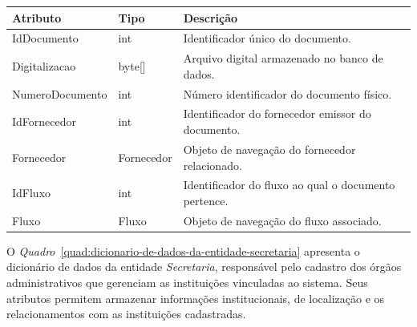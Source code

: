 \begin{quadro}[H]
\caption[Dicionário de dados da entidade Documento]{Dicionário de dados da entidade Documento}
\label{quad:dicionario-de-dados-da-entidade-documento}

\begin{tabular}{|p{}|p{}|p{}|}
\hline
\textbf{Atributo} & \textbf{Tipo} & \textbf{Descrição} \\ 
\hline
IdDocumento & int & Identificador único do documento. \\ 
\hline
Digitalizacao & byte[] & Arquivo digital armazenado no banco de dados. \\ 
\hline
NumeroDocumento & int & Número identificador do documento físico. \\ 
\hline
IdFornecedor & int & Identificador do fornecedor emissor do documento. \\ 
\hline
Fornecedor & Fornecedor & Objeto de navegação do fornecedor relacionado. \\ 
\hline
IdFluxo & int & Identificador do fluxo ao qual o documento pertence. \\ 
\hline
Fluxo & Fluxo & Objeto de navegação do fluxo associado. \\ 
\hline
\end{tabular}


\end{quadro}



O \textit{Quadro}~\ref{quad:dicionario-de-dados-da-entidade-secretaria} apresenta o dicionário de dados da entidade \textit{Secretaria}, responsável pelo cadastro dos órgãos administrativos que gerenciam as instituições vinculadas ao sistema. Seus atributos permitem armazenar informações institucionais, de localização e os relacionamentos com as instituições cadastradas.

